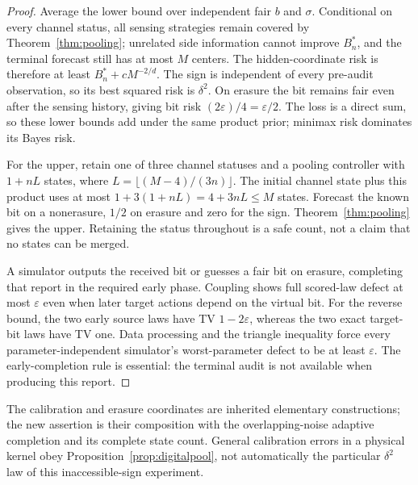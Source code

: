 \begin{proof}
Average the lower bound over independent fair $b$ and $\sigma$. Conditional on every channel status, all sensing strategies remain covered by Theorem~\ref{thm:pooling}; unrelated side information cannot improve $B_n^*$, and the terminal forecast still has at most $M$ centers. The hidden-coordinate risk is therefore at least $B_n^*+cM^{-2/d}$. The sign is independent of every pre-audit observation, so its best squared risk is $\delta^2$. On erasure the bit remains fair even after the sensing history, giving bit risk $(2\varepsilon)/4=\varepsilon/2$. The loss is a direct sum, so these lower bounds add under the same product prior; minimax risk dominates its Bayes risk.

For the upper, retain one of three channel statuses and a pooling controller with $1+nL$ states, where $L=\lfloor(M-4)/(3n)\rfloor$. The initial channel state plus this product uses at most $1+3(1+nL)=4+3nL\le M$ states. Forecast the known bit on a nonerasure, $1/2$ on erasure and zero for the sign. Theorem~\ref{thm:pooling} gives the upper. Retaining the status throughout is a safe count, not a claim that no states can be merged.

A simulator outputs the received bit or guesses a fair bit on erasure, completing that report in the required early phase. Coupling shows full scored-law defect at most $\varepsilon$ even when later target actions depend on the virtual bit. For the reverse bound, the two early source laws have TV $1-2\varepsilon$, whereas the two exact target-bit laws have TV one. Data processing and the triangle inequality force every parameter-independent simulator's worst-parameter defect to be at least $\varepsilon$. The early-completion rule is essential: the terminal audit is not available when producing this report.
\end{proof}
The calibration and erasure coordinates are inherited elementary constructions; the new assertion is their composition with the overlapping-noise adaptive completion and its complete state count. General calibration errors in a physical kernel obey Proposition~\ref{prop:digitalpool}, not automatically the particular $\delta^2$ law of this inaccessible-sign experiment.
